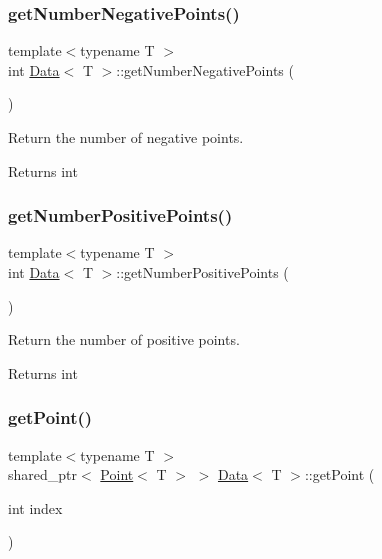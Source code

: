 \subsubsection{\texorpdfstring{get\+Number\+Negative\+Points()}{getNumberNegativePoints()}}
{\footnotesize\ttfamily template$<$typename T $>$ \\
int \mbox{\hyperlink{class_data}{Data}}$<$ T $>$\+::get\+Number\+Negative\+Points (\begin{DoxyParamCaption}{ }\end{DoxyParamCaption})}



Return the number of negative points. 

\begin{DoxyReturn}{Returns}
int 
\end{DoxyReturn}
\mbox{\label{class_data_a627911f72bc1ccc3a096b531772ccb8c}} 
\subsubsection{\texorpdfstring{get\+Number\+Positive\+Points()}{getNumberPositivePoints()}}
{\footnotesize\ttfamily template$<$typename T $>$ \\
int \mbox{\hyperlink{class_data}{Data}}$<$ T $>$\+::get\+Number\+Positive\+Points (\begin{DoxyParamCaption}{ }\end{DoxyParamCaption})}



Return the number of positive points. 

\begin{DoxyReturn}{Returns}
int 
\end{DoxyReturn}
\mbox{\label{class_data_a482efc1083d4871758ddd05b11bb90ea}} 
\subsubsection{\texorpdfstring{get\+Point()}{getPoint()}}
{\footnotesize\ttfamily template$<$typename T $>$ \\
shared\+\_\+ptr$<$ \mbox{\hyperlink{class_point}{Point}}$<$ T $>$ $>$ \mbox{\hyperlink{class_data}{Data}}$<$ T $>$\+::get\+Point (\begin{DoxyParamCaption}\item[{int}]{index }\end{DoxyParamCaption})}



